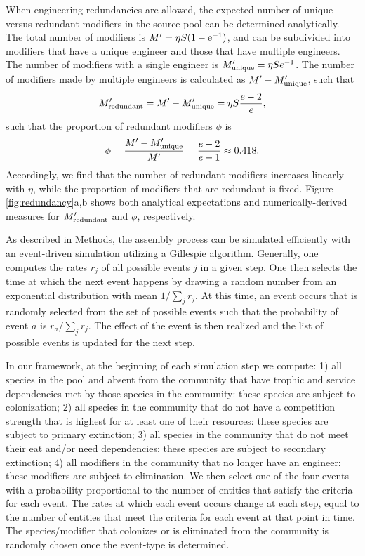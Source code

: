 \documentclass[twocolumn,preprintnumbers,amsmath,amssymb,superscriptaddress,linenumbers]{revtex4-1}
\newcommand{\rr}[1]{{\rm #1}}
\begin{document}
\begin{bibunit}
When engineering redundancies are allowed, the expected number of unique versus redundant modifiers in the source pool can be determined analytically.
The total number of modifiers is $M^\prime = \eta S (1 - \rr{e}^{-1})$, and can be subdivided into modifiers that have a unique engineer and those that have multiple engineers.
The number of modifiers with a single engineer is $M^\prime_{\rr{unique}} = \eta S e^{-1}$.
The number of modifiers made by multiple engineers is calculated as $M^\prime - M^\prime_{\rr{unique}}$, such that
\begin{equation}
M^\prime_{\rr{redundant}} =M^\prime - M^\prime_{\rr{unique}}= \eta S \frac{e - 2}{e},
\label{eq:redundant}
\end{equation}
such that the proportion of redundant modifiers $\phi$ is
\begin{equation}
\phi = \frac{M^\prime - M^\prime_{\rr{unique}}}{M^\prime} = \frac{e-2}{e-1} \approx 0.418.
\label{eq:redundantprop}
\end{equation}
Accordingly, we find that the number of redundant modifiers increases linearly with $\eta$, while the proportion of modifiers that are redundant is fixed.
Figure \ref{fig:redundancy}a,b shows both analytical expectations and numerically-derived measures for $M^\prime_{\rr{redundant}}$ and $\phi$, respectively.

As described in Methods, the assembly process can be simulated efficiently with an event-driven simulation utilizing a Gillespie algorithm.
Generally, one computes the rates $r_j$ of all possible events $j$ in a given step.
One then selects the time at which the next event happens by drawing a random number from an exponential distribution with mean $1/\sum_j{r_j}$.
At this time, an event occurs that is randomly selected from the set of possible events such that the probability of event $a$ is $r_a/\sum_j{r_j}$.
The effect of the event is then realized and the list of possible events is updated for the next step.

In our framework, at the beginning of each simulation step we compute:
1) all species in the pool and absent from the community that have trophic and service dependencies met by those species in the community: these species are subject to colonization;
2) all species in the community that do not have a competition strength that is highest for at least one of their resources: these species are subject to primary extinction;
3) all species in the community that do not meet their eat and/or need dependencies: these species are subject to secondary extinction;
4) all modifiers in the community that no longer have an engineer: these modifiers are subject to elimination.
We then select one of the four events with a probability proportional to the number of entities that satisfy the criteria for each event.
The rates at which each event occurs change at each step, equal to the number of entities that meet the criteria for each event at that point in time.
The species/modifier that colonizes or is eliminated from the community is randomly chosen once the event-type is determined.


\end{bibunit}
\end{document}
